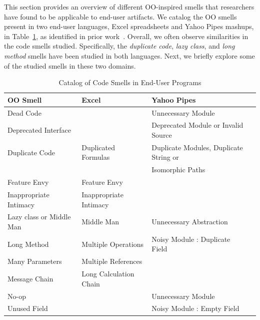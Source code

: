 \documentclass{sig-alternate}
\renewcommand*\cmidrule{\midrule[0.001em]} %
\begin{document}
This section provides an overview of different OO-inspired smells that researchers have found to be applicable to end-user artifacts. 
 We catalog the OO smells present in two end-user languages, Excel spreadsheets and Yahoo Pipes mashups, in Table~\ref{table:oosmellslarge}, as identified in prior work~\cite{Stolee2011,StoleeTSE2013,Hermans2012intra, Hermans2012inter}.
 Overall, we often observe similarities in the code smells studied. Specifically, the \emph{duplicate code}, \emph{lazy class}, and \emph{long method} smells  have been studied in both languages. 
Next, we briefly explore some of the studied smells in these two domains. 



\begin{table}
\caption{Catalog of Code Smells in End-User Programs
\label{table:oosmellslarge}}
\centering
\sffamily
\begin{tabular} {@{}llll@{}}
\toprule
\textbf{OO Smell}
	& \textbf{Excel}
	& \textbf{Yahoo Pipes}
\\ \midrule
Dead Code
	& %
	& Unnecessary Module \cite{StoleeTSE2013}
\\ \cmidrule
Deprecated Interface
	& %
	& Deprecated Module or Invalid Source \cite{StoleeTSE2013}

\\ \cmidrule
Duplicate Code
	& Duplicated Formulas \cite{Hermans2012intra}
	& Duplicate Modules, Duplicate String or
\\ %
& 
& Isomorphic Paths \cite{StoleeTSE2013}
\\ \cmidrule
Feature Envy
	& Feature Envy \cite{Hermans2012inter}
	& %
\\ \cmidrule
Inappropriate Intimacy
	& Inappropriate Intimacy \cite{Hermans2012inter}
	& %
\\ \cmidrule
Lazy class or Middle Man
	& Middle Man \cite{Hermans2012inter}
	& Unnecessary Abstraction \cite{StoleeTSE2013}
\\ \cmidrule
Long Method
	& Multiple Operations \cite{Hermans2012intra}
	& Noisy Module : Duplicate Field \cite{StoleeTSE2013}
\\ \cmidrule
Many Parameters
	& Multiple References \cite{Hermans2012intra}
	& 
\\ \cmidrule
Message Chain
	& Long Calculation Chain \cite{Hermans2012intra}
	& 
\\ \cmidrule
No-op
	& %
	& Unnecessary Module \cite{StoleeTSE2013}
\\ \cmidrule
Unused Field
	& %
	& Noisy Module : Empty Field \cite{StoleeTSE2013}
\\ \bottomrule
\end{tabular}
\end{table}
\end{document}
